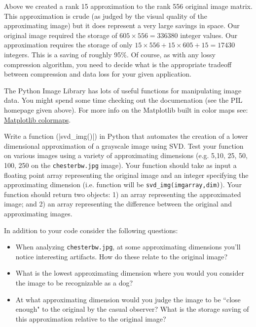 \begin{R}
\begin{python}
\end{python}

Above we created a rank 15 approximation to the rank 556 original image matrix. This approximation is crude (as judged by the visual quality of the approximating image) but it does represent a very large savings in space. Our original image required the storage of $605 \times 556 = 336380$ integer values. Our approximation requires the storage of only $15 \times 556 + 15 \times 605 + 15 = 17430$ integers. This is a saving of roughly 95\%. Of course, as with any lossy compression algorithm, you need to decide what is the appropriate tradeoff between compression and data loss for your given application.

The Python Image Library has lots of useful functions for manipulating image data. You might spend some time checking out the documenation (see the PIL homepage given above). For more info on the Matplotlib built in color maps see: \href{http://matplotlib.sourceforge.net/examples/pylab_examples/show_colormaps.html}{Matplotlib colormaps}.

\bigskip

\begin{assignment}
\small

Write a function (|svd_img()|) in Python that automates the creation of a lower dimensional approximation of a grayscale image using SVD.  Test your function on various images using a variety of approximating dimensions (e.g. 5,10, 25, 50, 100, 250 on the \verb|chesterbw.jpg| image).  Your function should take as input a floating point array representing the original image and an integer specifying the approximating dimension (i.e. function will be \verb|svd_img(imgarray,dim)|). Your function should return two objects: 1) an array representing the approximated image; and 2) an array representing the difference between the original and approximating images.

In addition to your code consider the following questions:

\begin{itemize}
\item When analyzing \texttt{chesterbw.jpg}, at some approximating dimensions you'll notice interesting artifacts. How do these relate to the original image? 

\item What is the lowest approximating dimension where you would you consider the image to be recognizable as a dog?
 
\item At what approximating dimension would you judge the  image to be ``close enough"  to the original by the casual observer? What is the storage saving of this approximation relative to the original image?


\end{itemize}
\end{assignment}
\end{R}
